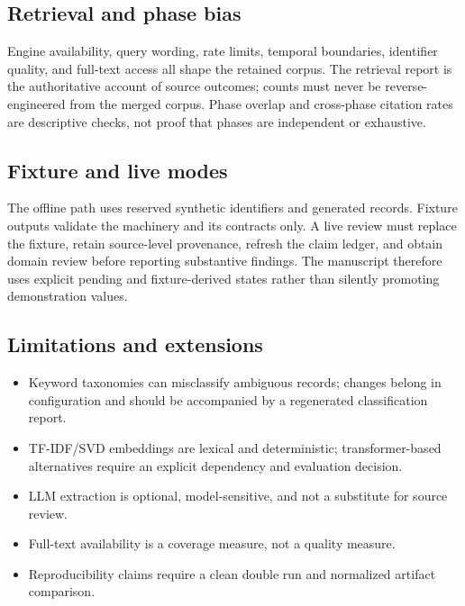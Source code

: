 \documentclass[
]{article}
\providecommand{\tightlist}{%
  \setlength{\itemsep}{0pt}\setlength{\parskip}{0pt}}
\begin{document}
\subsection{Retrieval and phase bias}\label{retrieval-and-phase-bias}

Engine availability, query wording, rate limits, temporal boundaries,
identifier quality, and full-text access all shape the retained corpus.
The retrieval report is the authoritative account of source outcomes;
counts must never be reverse-engineered from the merged corpus. Phase
overlap and cross-phase citation rates are descriptive checks, not proof
that phases are independent or exhaustive.

\subsection{Fixture and live modes}\label{fixture-and-live-modes}

The offline path uses reserved synthetic identifiers and generated
records. Fixture outputs validate the machinery and its contracts only.
A live review must replace the fixture, retain source-level provenance,
refresh the claim ledger, and obtain domain review before reporting
substantive findings. The manuscript therefore uses explicit pending and
fixture-derived states rather than silently promoting demonstration
values.

\subsection{Limitations and
extensions}\label{limitations-and-extensions}

\begin{itemize}
\tightlist
\item
  Keyword taxonomies can misclassify ambiguous records; changes belong
  in configuration and should be accompanied by a regenerated
  classification report.
\item
  TF-IDF/SVD embeddings are lexical and deterministic; transformer-based
  alternatives require an explicit dependency and evaluation decision.
\item
  LLM extraction is optional, model-sensitive, and not a substitute for
  source review.
\item
  Full-text availability is a coverage measure, not a quality measure.
\item
  Reproducibility claims require a clean double run and normalized
  artifact comparison.
\end{itemize}
\end{document}
